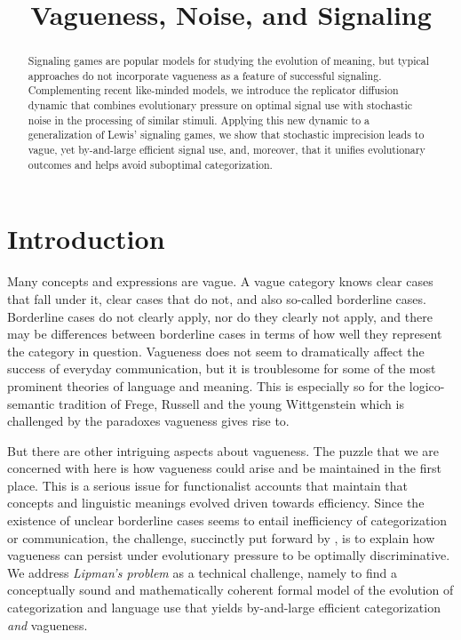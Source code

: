 \documentclass[fleqn,reqno,10pt]{article}
\title{Vagueness, Noise, and Signaling}
\date{}
\begin{document}
\maketitle

\begin{abstract}
  Signaling games are popular models for studying the evolution of meaning, but typical
  approaches do not incorporate vagueness as a feature of successful signaling.  Complementing
  recent like-minded models, we introduce the replicator diffusion dynamic that combines
  evolutionary pressure on optimal signal use with stochastic noise in the processing of
  similar stimuli. Applying this new dynamic to a generalization of Lewis' signaling games, we
  show that stochastic imprecision leads to vague, yet by-and-large efficient signal use, and,
  moreover, that it unifies evolutionary outcomes and helps avoid suboptimal categorization.
\end{abstract}

\section{Introduction}
\label{sec:introduction}

Many concepts and expressions are vague. A vague category knows clear
cases that fall under it, clear cases that do not, and also so-called
borderline cases. Borderline cases do not clearly apply, nor do they
clearly not apply, and there may be differences between borderline
cases in terms of how well they represent the category in
question. Vagueness does not seem to dramatically affect the success
of everyday communication, but it is troublesome for some of the most
prominent theories of language and meaning. This is especially so for the logico-semantic tradition of Frege, Russell and the young
Wittgenstein which is challenged by the paradoxes vagueness gives rise
to. 

But there are other intriguing aspects about vagueness. The puzzle
that we are concerned with here is how vagueness could arise and be
maintained in the first place. This is a serious issue for
functionalist accounts that maintain that concepts and linguistic
meanings evolved driven towards efficiency. Since the existence of
unclear borderline cases seems to entail inefficiency of
categorization or communication, the challenge, succinctly put forward
by \citet{Lipman2009:Why-is-Language}, is to explain how vagueness can
persist under evolutionary pressure to be optimally discriminative. We
address \emph{Lipman's problem} as a technical challenge, namely to
find a conceptually sound and mathematically coherent formal model of
the evolution of categorization and language use that yields
by-and-large efficient categorization \emph{and} vagueness.
\end{document}
